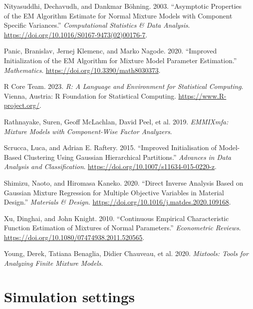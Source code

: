 \begin{CSLReferences}{1}{0}
\leavevmode{}%
Nityasuddhi, Dechavudh, and Dankmar Böhning. 2003. {``Asymptotic Properties of the {EM} Algorithm Estimate for Normal Mixture Models with Component Specific Variances.''} \emph{Computational Statistics \& Data Analysis}. \url{https://doi.org/10.1016/S0167-9473(02)00176-7}.

\leavevmode{}%
Panic, Branislav, Jernej Klemenc, and Marko Nagode. 2020. {``Improved Initialization of the EM Algorithm for Mixture Model Parameter Estimation.''} \emph{Mathematics}. \url{https://doi.org/10.3390/math8030373}.

\leavevmode{}%
R Core Team. 2023. \emph{R: A Language and Environment for Statistical Computing}. Vienna, Austria: R Foundation for Statistical Computing. \url{https://www.R-project.org/}.

\leavevmode{}%
Rathnayake, Suren, Geoff McLachlan, David Peel, et al. 2019. \emph{EMMIXmfa: Mixture Models with Component-Wise Factor Analyzers}.

\leavevmode{}%
Scrucca, Luca, and Adrian E. Raftery. 2015. {``Improved Initialisation of Model-Based Clustering Using {Gaussian} Hierarchical Partitions.''} \emph{Advances in Data Analysis and Classification}. \url{https://doi.org/10.1007/s11634-015-0220-z}.

\leavevmode{}%
Shimizu, Naoto, and Hiromasa Kaneko. 2020. {``Direct Inverse Analysis Based on {Gaussian} Mixture Regression for Multiple Objective Variables in Material Design.''} \emph{Materials \& Design}. \url{https://doi.org/10.1016/j.matdes.2020.109168}.

\leavevmode{}%
Xu, Dinghai, and John Knight. 2010. {``Continuous {Empirical Characteristic Function Estimation} of {Mixtures} of {Normal Parameters}.''} \emph{Econometric Reviews}. \url{https://doi.org/10.1080/07474938.2011.520565}.

\leavevmode{}%
Young, Derek, Tatiana Benaglia, Didier Chauveau, et al. 2020. \emph{Mixtools: Tools for Analyzing Finite Mixture Models}.

\end{CSLReferences}

\newpage

\hypertarget{simulation-settings}{%
\section{Simulation settings}\label{simulation-settings}}

